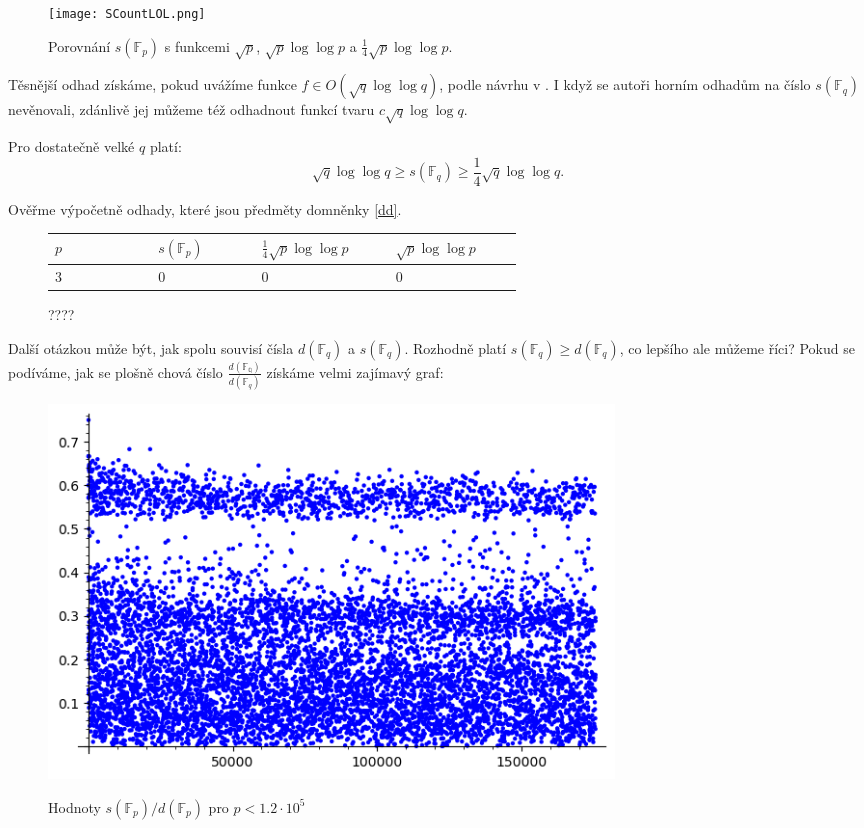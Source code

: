 \documentclass[12pt]{report}
\begin{document}
\begin{figure}[h]
  \texttt{[image: SCountLOL.png]}
  \label{fig:boat1}
\caption{Porovnání $s(\mathbb{F}_p)$ s funkcemi $\sqrt{p}$, $\sqrt{p} \log \log p$ a $\frac{1}{4} \sqrt{p} \log \log p$.}
\end{figure}

Těsnější odhad získáme, pokud uvážíme funkce $f \in O(\sqrt{q} \log \log q)$, podle návrhu v \cite{Meduza}. I když se autoři horním odhadům na číslo $s(\mathbb{F}_q)$ nevěnovali, zdánlivě jej můžeme též odhadnout funkcí tvaru $c \sqrt{q} \log \log q$.
\begin{domnenka}\label{dd}
Pro dostatečně velké $q$ platí:
$$\sqrt{q} \log \log q \geqslant s(\mathbb{F}_q) \geqslant \frac{1}{4} \sqrt{q} \log \log q.$$
\end{domnenka}
Ověřme výpočetně odhady, které jsou předměty domněnky \ref{dd}.


\begin{figure}[h]
 \begin{longtable}[H]{>{\raggedright\arraybackslash}p{0.15\linewidth}p{0.15\linewidth}p{0.15\linewidth}p{0.15\linewidth}}
\toprule
$p$ & $s(\mathbb{F}_p)$ & $\frac{1}{4} \sqrt{p} \log \log p$ & $\sqrt{p} \log \log p$\\
\midrule
$3$ & \noindent $0$ & \noindent $0$ & $0$\\
\bottomrule 
\end{longtable}
\caption{????}
\end{figure}

Další otázkou může být, jak spolu souvisí čísla $d(\mathbb{F}_q)$ a $s(\mathbb{F}_q)$. Rozhodně platí $s(\mathbb{F}_q) \geqslant d(\mathbb{F}_q)$, co lepšího ale můžeme říci? Pokud se podíváme, jak se plošně chová číslo $\frac{d(\mathbb{F_q})}{d(\mathbb{F}_q)}$ získáme velmi zajímavý graf:


\begin{figure}[h]
  \includegraphics[width=15cm]{Podil.png}
  \label{fig:boat1}
  \caption{Hodnoty $s(\mathbb{F}_p)/d(\mathbb{F}_p)$ pro $p < 1.2 \cdot 10^5$}
\end{figure}
\end{document}
